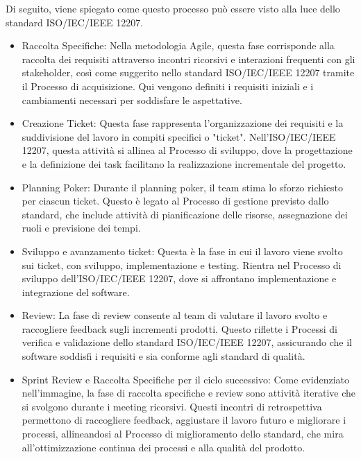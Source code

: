 Di seguito, viene spiegato come questo processo può essere visto alla luce dello standard ISO/IEC/IEEE 12207.
\begin{itemize}
    \item Raccolta Specifiche: Nella metodologia Agile, questa fase corrisponde alla raccolta dei requisiti attraverso incontri ricorsivi e interazioni frequenti con gli stakeholder, così come suggerito nello standard ISO/IEC/IEEE 12207 tramite il Processo di acquisizione. Qui vengono definiti i requisiti iniziali e i cambiamenti necessari per soddisfare le aspettative.
    \item Creazione Ticket: Questa fase rappresenta l'organizzazione dei requisiti e la suddivisione del lavoro in compiti specifici o "ticket". Nell'ISO/IEC/IEEE 12207, questa attività si allinea al Processo di sviluppo, dove la progettazione e la definizione dei task facilitano la realizzazione incrementale del progetto.
    \item Planning Poker: Durante il planning poker, il team stima lo sforzo richiesto per ciascun ticket. Questo è legato al Processo di gestione previsto dallo standard, che include attività di pianificazione delle risorse, assegnazione dei ruoli e previsione dei tempi.
    \item Sviluppo e avanzamento ticket: Questa è la fase in cui il lavoro viene svolto sui ticket, con sviluppo, implementazione e testing. Rientra nel Processo di sviluppo dell'ISO/IEC/IEEE 12207, dove si affrontano implementazione e integrazione del software.
    \item Review: La fase di review consente al team di valutare il lavoro svolto e raccogliere feedback sugli incrementi prodotti. Questo riflette i Processi di verifica e validazione dello standard ISO/IEC/IEEE 12207, assicurando che il software soddisfi i requisiti e sia conforme agli standard di qualità.
    \item Sprint Review e Raccolta Specifiche per il ciclo successivo: Come evidenziato nell'immagine, la fase di raccolta specifiche e review sono attività iterative che si svolgono durante i meeting ricorsivi. Questi incontri di retrospettiva permettono di raccogliere feedback, aggiustare il lavoro futuro e migliorare i processi, allineandosi al Processo di miglioramento dello standard, che mira all'ottimizzazione continua dei processi e alla qualità del prodotto.
\end{itemize}

    
   
    







